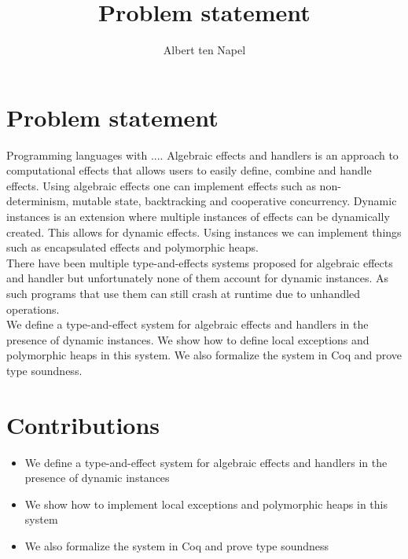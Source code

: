 \documentclass[12pt]{article}
\title{Problem statement}
\author{Albert ten Napel}
\date{}
\begin{document}
\maketitle




\section{Problem statement}
Programming languages with .... Algebraic effects and handlers is an approach to computational effects that allows users to easily define, combine and handle effects. Using algebraic effects one can implement effects such as non-determinism, mutable state, backtracking and cooperative concurrency.
Dynamic instances is an extension where multiple instances of effects can be dynamically created. This allows for dynamic effects. Using instances we can implement things such as encapsulated effects and polymorphic heaps.
\\
There have been multiple type-and-effects systems proposed for algebraic effects and handler but unfortunately none of them account for dynamic instances. As such programs that use them can still crash at runtime due to unhandled operations. \\
We define a type-and-effect system for algebraic effects and handlers in the presence of dynamic instances.
We show how to define local exceptions and polymorphic heaps in this system.
We also formalize the system in Coq and prove type soundness.

\section{Contributions}
\begin{itemize}
\item We define a type-and-effect system for algebraic effects and handlers in the presence of dynamic instances
\item We show how to implement local exceptions and polymorphic heaps in this system
\item We also formalize the system in Coq and prove type soundness
\end{itemize}
\end{document}
